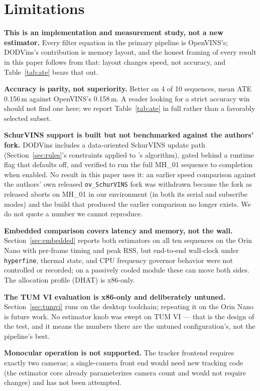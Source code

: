 \documentclass[10pt,conference,letterpaper]{IEEEtran}
\begin{document}
\section{Limitations}
\label{sec:limitations}

\textbf{This is an implementation and measurement study, not a new
estimator.} Every filter equation in the primary pipeline is OpenVINS's;
DODVins's contribution is memory layout, and the honest framing
of every result in this paper follows from that: layout changes speed, not
accuracy, and Table~\ref{tab:ate} bears that out.

\textbf{Accuracy is parity, not superiority.} Better on 4 of 10 sequences,
mean ATE 0.156\,m against OpenVINS's 0.158\,m. A reader looking for a strict
accuracy win should not find one here; we report Table~\ref{tab:ate} in full
rather than a favorably selected subset.

\textbf{SchurVINS support is built but not benchmarked against the authors'
fork.} DODVins includes a data-oriented SchurVINS update path
(Section~\ref{sec:rules}'s constraints applied to \cite{fan2024schurvins}'s
algorithm), gated behind a runtime flag that defaults off, and verified to
run the full MH\_01 sequence to completion when enabled. No result in this
paper uses it: an earlier speed comparison
against the authors' own released \texttt{ov\_SchurVINS} fork was withdrawn
because the fork as released aborts on MH\_01 in our environment (in both
its serial and subscribe modes) and the build that produced the earlier
comparison no longer exists. We do not quote a number we cannot reproduce.

\textbf{Embedded comparison covers latency and memory, not the wall.}
Section~\ref{sec:embedded} reports both estimators on all ten sequences on
the Orin Nano with per-frame timing and peak RSS, but end-to-end wall-clock
under \texttt{hyperfine}, thermal state, and CPU frequency governor behavior
were not controlled or recorded; on a passively cooled module these can move
both sides. The allocation profile (DHAT) is x86-only.

\textbf{The TUM VI evaluation is x86-only and deliberately untuned.}
Section~\ref{sec:tumvi} runs on the desktop toolchain; repeating it on the
Orin Nano is future work. No estimator knob was swept on TUM VI --- that is
the design of the test, and it means the numbers there are the untuned
configuration's, not the pipeline's best.

\textbf{Monocular operation is not supported.} The tracker frontend requires
exactly two cameras; a single-camera front end would need new tracking code
(the estimator core already parameterizes camera count and would not
require changes) and has not been attempted.
\end{document}
